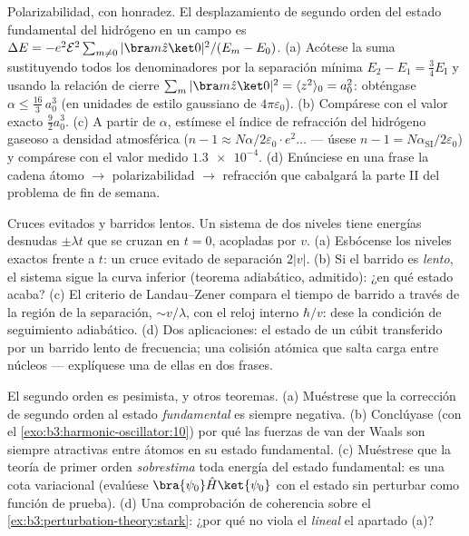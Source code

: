 \begin{exercise}[$\star\star\star$]\label{exo:b3:perturbation-theory:10}
Polarizabilidad, con honradez. El desplazamiento de segundo orden del estado
fundamental del hidrógeno en un campo es $\Delta E = -e^2\mathcal E^2\sum_{m\neq
0}|\bra m\hat z\ket 0|^2/(E_m - E_0)$. (a) Acótese la suma
sustituyendo todos los denominadores por la separación mínima $E_2 - E_1 =
\tfrac34 E_{\text{I}}$ y usando la relación de cierre $\sum_m|\bra
m\hat z\ket0|^2 = \langle z^2\rangle_0 = a_0^2$: obténgase $\alpha
\le \tfrac{16}3\,a_0^3$ (en unidades de estilo gaussiano de
$4\pi\varepsilon_0$). (b) Compárese con el valor exacto $\tfrac92 a_0^3$.
(c) A partir de $\alpha$, estímese el índice de refracción del hidrógeno
gaseoso a densidad atmosférica ($n - 1 \approx N\alpha/2\varepsilon_0
\cdot e^2\dots$ --- úsese $n - 1 = N\alpha_{\text{SI}}/2
\varepsilon_0$) y compárese con el valor medido $\num{1.3e-4}$.
(d) Enúnciese en una frase la cadena átomo $\to$ polarizabilidad
$\to$ refracción que cabalgará la parte II del problema de fin de semana.
\end{exercise}

\begin{exercise}[$\star\star\star$]\label{exo:b3:perturbation-theory:11}
Cruces evitados y barridos lentos. Un sistema de dos niveles tiene energías
desnudas $\pm\lambda t$ que se cruzan en $t = 0$, acopladas por $v$. (a)
Esbócense los niveles exactos frente a $t$: un cruce evitado de separación
$2|v|$. (b) Si el barrido es \emph{lento}, el sistema sigue la curva
inferior (teorema adiabático, admitido): ¿en qué estado acaba? (c) El
criterio de Landau--Zener compara el tiempo de barrido a través de la región
de la separación, $\sim v/\lambda$, con el reloj interno
$\hbar/v$: dese la condición de seguimiento adiabático. (d) Dos
aplicaciones: el estado de un cúbit transferido por un barrido lento de
frecuencia; una colisión atómica que salta carga entre núcleos --- explíquese
una de ellas en dos frases.
\end{exercise}

\begin{exercise}[$\star\star\star$]\label{exo:b3:perturbation-theory:12}
El segundo orden es pesimista, y otros teoremas. (a) Muéstrese que
la corrección de segundo orden al estado \emph{fundamental} es siempre
negativa. (b) Conclúyase (con el
\cref{exo:b3:harmonic-oscillator:10}) por qué las fuerzas de van der Waals
son siempre atractivas entre átomos en su estado fundamental. (c) Muéstrese
que la teoría de primer orden \emph{sobrestima} toda energía del estado
fundamental: es una cota variacional (evalúese $\bra{\psi_0}\hat
H\ket{\psi_0}$ con el estado sin perturbar como función de prueba). (d) Una
comprobación de coherencia sobre el \cref{ex:b3:perturbation-theory:stark}:
¿por qué no viola el  \emph{lineal} el apartado (a)?
\end{exercise}

